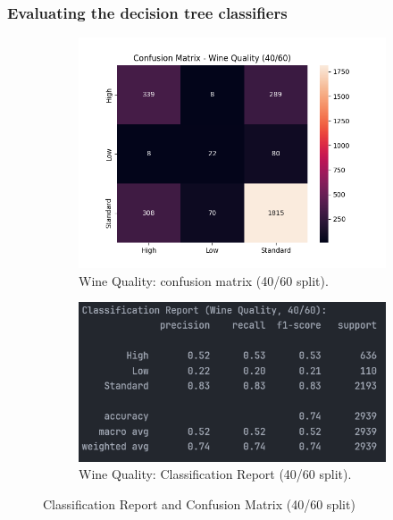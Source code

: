 \subsubsection*{Evaluating the decision tree classifiers}
\begin{figure}[H]
	\centering
	\begin{subfigure}{0.45\textwidth}
		\centering
		\includegraphics[width=\textwidth]{imgs/confusion_mat/confusion_mat__wine_quality__40_vs_60.png}
		\caption{Wine Quality: confusion matrix (40/60 split).}\label{fig:wq-cm-40-60}
	\end{subfigure}
	\hfill
	\begin{subfigure}{0.45\textwidth}
		\centering
		\includegraphics[width=\textwidth]{imgs/confusion_mat/class_rp__wine_quality__40_vs_60.png}
		\caption{Wine Quality: Classification Report (40/60 split).}\label{fig:wq-cr-40-60}
	\end{subfigure}

	\caption{Classification Report and Confusion Matrix (40/60 split)}\label{fig:wq-eval-40-60}
\end{figure}
